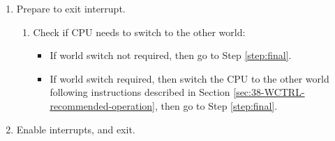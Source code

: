 \documentclass[main\_\_EN.tex]{subfiles}
\begin{document}
\begin{enumerate}
\begin{itemize}
\begin{itemize}
\begin{enumerate}
\begin{itemize}
                        \item If it points to other address, then no need to update the return address.
                    \end{itemize}
                    \item Update the :
                    \begin{itemize}
                        \item Update the world switch register of Entry :
                        \begin{itemize}
                            \item Update Field \hyperref[fielddesc:WCLCORE0CURRENTn]{WCL\_CORE\_\_CURRENT\_} to 0, indicating the CPU is no longer at the interrupt monitored at Entry .
                            \item Fields \hyperref[fielddesc:WCLCORE0FROMWORLDn]{WCL\_CORE\_\_FROM\_WORLD\_} and \hyperref[fielddesc:WCLCORE0FROMENTRYn]{WCL\_CORE\_\_FROM\_ENTRY\_} stay the same.
                        \end{itemize}
                        \item Update the  world switch register of Entry :
                        \begin{itemize}
                            \item Update Field  \hyperref[fielddesc:WCLCORE0CURRENTn]{WCL\_CORE\_\_CURRENT\_} to 1, indicating the CPU will return to Entry .
                        \end{itemize}
                     \end{itemize}
            \end{enumerate}
            \end{itemize}
        \end{itemize}
        \item Prepare to exit interrupt.\label{step:last-step}
            \begin{enumerate}
                \item Check if CPU needs to switch to the other world:
                    \begin{itemize}
                        \item If world switch not required, then go to Step \ref{step:final}.
                        \item If world switch required, then switch the CPU to the other world following instructions described in Section \ref{sec:38-WCTRL-recommended-operation}, then go to Step \ref{step:final}.
                    \end{itemize}
            \end{enumerate}
        \item Enable interrupts, and exit. \label{step:final}
\end{enumerate}
\end{document}
